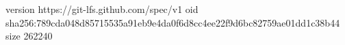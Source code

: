 version https://git-lfs.github.com/spec/v1
oid sha256:789cda048d85715535a91eb9e4da0f6d8cc4ee22f9d6bc82759ae01dd1c38b44
size 262240
